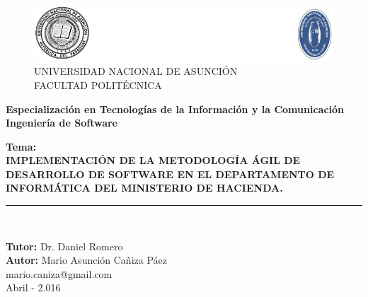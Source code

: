 \begin{titlepage}
		\begin{center}
			\vspace*{0.8in}
			\begin{figure}
				\centering
				\includegraphics[width=0.9\linewidth]{graficos/unalogos.jpg}
				UNIVERSIDAD NACIONAL DE ASUNCIÓN\\
				\vspace*{0.15in}
				FACULTAD POLITÉCNICA\\
			\end{figure}
			\begin{large}
				\textbf{Especialización en Tecnologías de la Información y la Comunicación}\\
				\vspace*{0.3in}
				\textbf{Ingeniería de Software}\\
			\end{large}
			\vspace*{0.8in}
			\begin{Large}
				\textbf{Tema:} \\
				\textbf{IMPLEMENTACIÓN DE LA METODOLOGÍA ÁGIL DE DESARROLLO DE SOFTWARE EN EL DEPARTAMENTO DE INFORMÁTICA DEL MINISTERIO DE HACIENDA.} \\
			\end{Large}
			\vspace*{0.3in}
			\rule{80mm}{0.1mm}\\
			\vspace*{0.4in}
			\begin{large}
				\textbf{Tutor:} Dr. Daniel Romero\\
				\vspace*{0.6in}
				\textbf{Autor:} Mario Asunción Cañiza  Páez\\mario.caniza@gmail.com\\
				\vspace*{0.6in}
				Abril - 2.016
				\vspace*{0.20in}
			\end{large}
		\end{center}
	\end{titlepage}